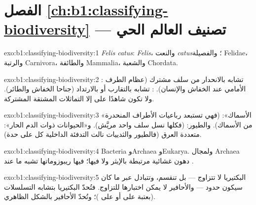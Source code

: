 \section*{الفصل \ref{ch:b1:classifying-biodiversity} --- تصنيف العالم الحي}

\begin{solution}{exo:b1:classifying-biodiversity:1}
\emph{Felis catus}:  \emph{Felis}، والنعت \emph{catus}؛ والفصيلة
Felidae، والرتبة Carnivora، والطائفة Mammalia، والشعبة Chordata.
\end{solution}

\begin{solution}{exo:b1:classifying-biodiversity:2}
: تشابه بالانحدار من سلف مشترك (عظام الطرف
الأمامي عند الخفاش والإنسان). : تشابه بالتقارب أو
بالارتداد (جناحا الخفاش والطائر). ولا تكون شاهدًا على  إلا
التماثلات المشتقة المشتركة.
\end{solution}

\begin{solution}{exo:b1:classifying-biodiversity:3}
«الأسماك»:  (فهي تستبعد رباعيات الأطراف المنحدرة من
الأسماك). والطيور:  (فكلها نسل سلف واحد
مريَّش). و«الحيوانات ذوات الدم الحار»: متعددة العرق (فالطيور والثدييات
نالت التدفئة الداخلية كل على حدة).
\end{solution}

\begin{solution}{exo:b1:classifying-biodiversity:4}
Bacteria وArchaea وEukarya. ولمجال Archaea دهون غشائية مرتبطة
بالإيثر ولا  فيها؛  فيها 
ريبوزوماتها تشبه ما عند .
\end{solution}

\begin{solution}{exo:b1:classifying-biodiversity:5}
البكتيريا لا تتزاوج --- بل تنقسم، وتتبادل  عبر
ما كان سيكون حدود  --- والأحافير لا يمكن اختبارها
للتزاوج. فتُحدّ البكتيريا بتشابه التسلسلات (بعتبة
على  أو على )؛ وتُحدّ الأحافير بالشكل الظاهري.
\end{solution}


